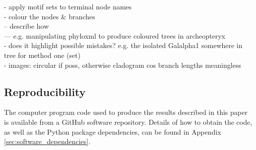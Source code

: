\documentclass[12pt,a4paper]{article}
\begin{document}
- apply motif sets to terminal node names\\
- colour the nodes \& branches\\
-- describe how\\
--- e.g. manipulating phyloxml to produce coloured trees in archeopteryx\\
- does it highlight possible mistakes? e.g. the isolated Galalpha1 somewhere in tree for method one (set)\\
- images: circular if poss, otherwise cladogram cos branch lengths meaningless\\


\subsection{Reproducibility}
\label{sec:reproducibility}
The computer program code used to produce the results described in this paper is available from a GitHub software repository. Details of how to obtain the code, as well as the Python package dependencies, can be found in Appendix \ref{sec:software_dependencies}.







\end{document}
